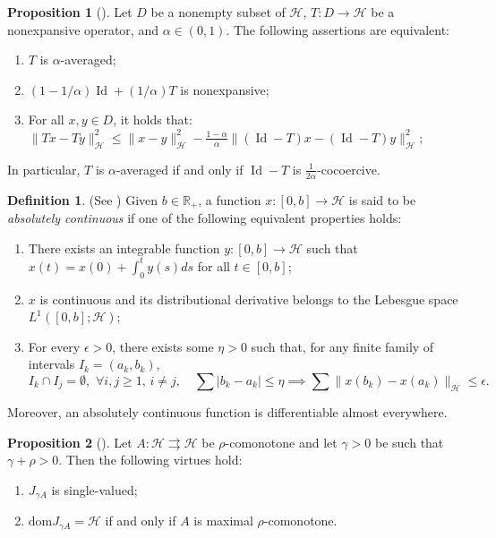 \documentclass{article}
\theoremstyle{definition}
\newtheorem{proposition}{Proposition}[section]
\theoremstyle{definition}
\newtheorem{definition}{Definition}[section]
\theoremstyle{definition}
\begin{document}
\begin{proposition} [\cite{bauschke2017convex}] \label{prop:averaged_characterization}
Let $D$ be a nonempty subset of $\mathcal{H}$, $T: D \to \mathcal{H}$ be a nonexpansive operator, and $\alpha \in \left( 0, 1 \right)$. The following assertions are equivalent:
\begin{enumerate}
    \item[\rm (1)] $T$ is $\alpha$-averaged;
    \item[\rm (2)] $\left( 1 - 1/\alpha \right)\operatorname{Id} + \left( 1/\alpha \right)T$ is nonexpansive;
    \item[\rm (3)] For all $x, y \in D$, it holds that:
    $
    \| Tx - Ty \|_{\mathcal{H}}^2 \leq \| x - y \|_{\mathcal{H}}^2 - \frac{1 - \alpha}{\alpha} \| (\operatorname{Id} - T)x - (\operatorname{Id} - T)y \|_{\mathcal{H}}^2;
    $
\end{enumerate}
In particular, $T$ is $\alpha$-averaged if and only if $\operatorname{Id} - T$ is $\frac{1}{2\alpha}$-cocoercive.
\end{proposition}

\begin{definition} {(See \cite[Definition 2.1]{AttouchSvaiter2011})}
\label{def:absolute_continuity}
Given $b \in \mathbb{R}_{+}$, a function $x : [0, b] \to \mathcal{H}$ is said to be {\it absolutely continuous} if one of the following equivalent properties holds:
\begin{enumerate}
    \item[\rm (1)] There exists an integrable function $y : [0, b] \to \mathcal{H}$ such that $x(t) = x(0) + \int_0^t y(s) ds$ for all $t \in [0, b]$;
    \item[\rm (2)] $x$ is continuous and its distributional derivative belongs to the Lebesgue space $L^1([0, b]; \mathcal{H})$;
    \item[\rm (3)] For every $\epsilon > 0$, there exists some $\eta > 0$ such that, for any finite family of intervals $I_k = (a_k, b_k)$,
    \begin{equation*}
    I_k \cap I_j = \emptyset, \,\, \forall i, j \geq 1, \, i \neq j, \quad \sum |b_k - a_k| \leq \eta \implies \sum \|x(b_k) - x(a_k)\|_{\mathcal{H}} \leq \epsilon.
    \end{equation*}
\end{enumerate}
Moreover, an absolutely continuous function is differentiable almost everywhere.
\end{definition}

\begin{proposition} [\cite{Bartz S2022}] \label{prop:resolvent_single_valued}
Let $A: \mathcal{H} \rightrightarrows \mathcal{H}$ be $\rho$-comonotone and let $\gamma > 0$ be such that $\gamma + \rho > 0$. Then the following virtues hold:
\begin{enumerate}
    \item[\rm (1)] $J_{\gamma A}$ is single-valued;
    \item[\rm (2)] $\mathrm{dom} J_{\gamma A} = \mathcal{H}$ if and only if $A$ is maximal $\rho$-comonotone.
\end{enumerate}
\end{proposition}
\end{document}

